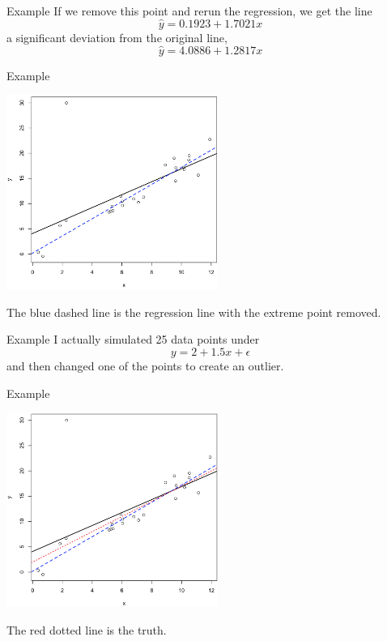 \begin{frame}{Example}
    If we remove this point and rerun the regression, we get the line
    \[
        \hat{y} = 0.1923 + 1.7021x
    \]
    a significant deviation from the original line,
    \[
        \hat{y} = 4.0886 + 1.2817x
    \]
\end{frame}

\begin{frame}{Example}
    \begin{center}
        \includegraphics[height=2.5in]{images/outlier2lines.png}
    \end{center}
    \vspace{-0.5cm}The blue dashed line is the regression line with the extreme point removed.
\end{frame}

\begin{frame}{Example}
    I actually simulated 25 data points under
    \[
        y = 2 + 1.5x + \epsilon
    \]
    and then changed one of the points to create an outlier.
\end{frame}

\begin{frame}{Example}
    \begin{center}
        \includegraphics[height=2.5in]{images/outlier3lines.png}
    \end{center}
    \vspace{-0.5cm}The red dotted line is the truth.
\end{frame}

